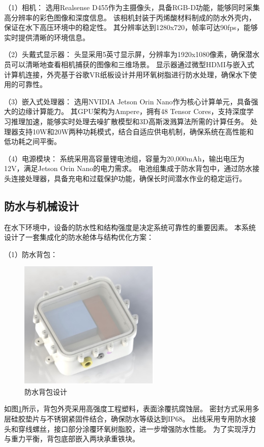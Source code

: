 （1）相机：
选用Realsense D455作为主摄像头，具备RGB-D功能，能够同时采集高分辨率的彩色图像和深度信息。
该相机封装于丙烯酸材料制成的防水外壳内，保证在水下高压环境中的稳定性。
其分辨率达到1280x720，帧率可达90fps，能够实时提供清晰的环境信息。

（2）头戴式显示器：
头显采用5英寸显示屏，分辨率为1920x1080像素，确保潜水员可以清晰地查看相机捕获的图像和三维场景。
显示器通过微型HDMI与嵌入式计算机连接，外壳基于谷歌VR纸板设计并用环氧树脂进行防水处理，确保水下使用的可靠性。

（3）嵌入式处理器：
选用NVIDIA Jetson Orin Nano作为核心计算单元，具备强大的边缘计算能力。
其GPU架构为Ampere，拥有48 Tensor Cores，支持深度学习推理加速，能够实时处理去噪扩散模型和3D高斯泼溅算法所需的计算任务。
处理器支持10W和20W两种功耗模式，结合自适应供电机制，确保系统在高性能和低功耗之间平衡。

（4）电源模块：
系统采用高容量锂电池组，容量为20,000mAh，输出电压为12V，满足Jetson Orin Nano的电力需求。
电池组集成于防水背包中，通过防水接头连接处理器，具备充电和过载保护功能，确保长时间潜水作业的稳定运行。

\subsection{防水与机械设计}
在水下环境中，设备的防水性和结构强度是决定系统可靠性的重要因素。
本系统设计了一套集成化的防水舱体与结构优化方案：

（1）防水背包：
\begin{figure}[h]
    \centering
    \includegraphics[width=0.6\textwidth]{figures/ch5/bag.jpg}
    \caption{防水背包设计}
    \label{img:bag}
\end{figure}

如图\ref{img:bag}所示，背包外壳采用高强度工程塑料，表面涂覆抗腐蚀层。
密封方式采用多层硅胶垫片与不锈钢紧固件结合，确保防水等级达到IP68。
出线采用专用防水接头和穿线螺丝，接口部分涂覆环氧树脂胶，进一步增强防水性能。
为了实现浮力与重力平衡，背包底部嵌入两块承重铁块。

